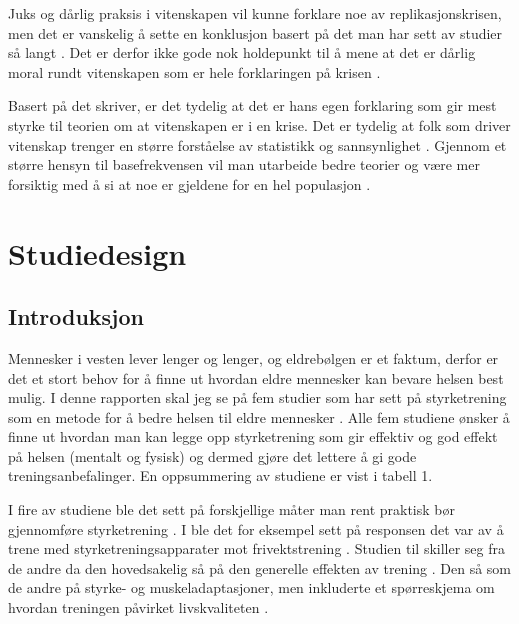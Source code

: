 \documentclass[
]{book}
\begin{document}
Juks og dårlig praksis i vitenskapen vil kunne forklare noe av
replikasjonskrisen, men det er vanskelig å sette en konklusjon basert på
det man har sett av studier så langt \citep{bird2020}. Det er derfor ikke
gode nok holdepunkt til å mene at det er dårlig moral rundt vitenskapen
som er hele forklaringen på krisen \citep{bird2020}.

Basert på det \citet{bird2020} skriver, er det tydelig at det er hans egen
forklaring som gir mest styrke til teorien om at vitenskapen er i en
krise. Det er tydelig at folk som driver vitenskap trenger en større
forståelse av statistikk og sannsynlighet \citep{bird2020}. Gjennom et større
hensyn til basefrekvensen vil man utarbeide bedre teorier og være mer
forsiktig med å si at noe er gjeldene for en hel populasjon \citep{bird2020}.

\hypertarget{studiedesign}{%
\chapter{Studiedesign}\label{studiedesign}}

\hypertarget{introduksjon-1}{%
\section{Introduksjon}\label{introduksjon-1}}

Mennesker i vesten lever lenger og lenger, og eldrebølgen er et faktum, derfor er det et stort behov for å finne ut hvordan eldre mennesker kan bevare helsen best mulig. I denne rapporten skal jeg se på fem studier som har sett på styrketrening som en metode for å bedre helsen til eldre mennesker \citep{geirsdottir2012, schott2019, turpela2017, vikberg2019, vincent2002}. Alle fem studiene ønsker å finne ut hvordan man kan legge opp styrketrening som gir effektiv og god effekt på helsen (mentalt og fysisk) og dermed gjøre det lettere å gi gode treningsanbefalinger. En oppsummering av studiene er vist i tabell 1.

I fire av studiene ble det sett på forskjellige måter man rent praktisk bør gjennomføre styrketrening \citetext{\citealp[ ]{schott2019}; \citealp{turpela2017}; \citealp{vikberg2019}; \citealp{vincent2002}}. I \citet{schott2019} ble det for eksempel sett på responsen det var av å trene med styrketreningsapparater mot frivektstrening \citep{schott2019}. Studien til \citet{geirsdottir2012} skiller seg fra de andre da den hovedsakelig så på den generelle effekten av trening \citep{geirsdottir2012}. Den så som de andre på styrke- og muskeladaptasjoner, men inkluderte et spørreskjema om hvordan treningen påvirket livskvaliteten \citep{geirsdottir2012}.
\end{document}
